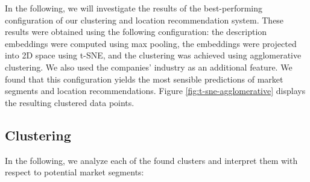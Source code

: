 \documentclass[conference]{IEEEtran}
\begin{document}
In the following, we will investigate the results of the best-performing configuration of our clustering and location recommendation system. These results were obtained using the following configuration: the description embeddings were computed using max pooling, the embeddings were projected into 2D space using t-SNE, and the clustering was achieved using agglomerative clustering. We also used the companies' industry as an additional feature.
 We found that this configuration yields the most sensible predictions of market segments and location recommendations. Figure \ref{fig:t-sne-agglomerative} displays the resulting clustered data points.

\subsection{Clustering}
\label{sec:clustering-results}
In the following, we analyze each of the found clusters and interpret them with respect to potential market segments:
\end{document}
